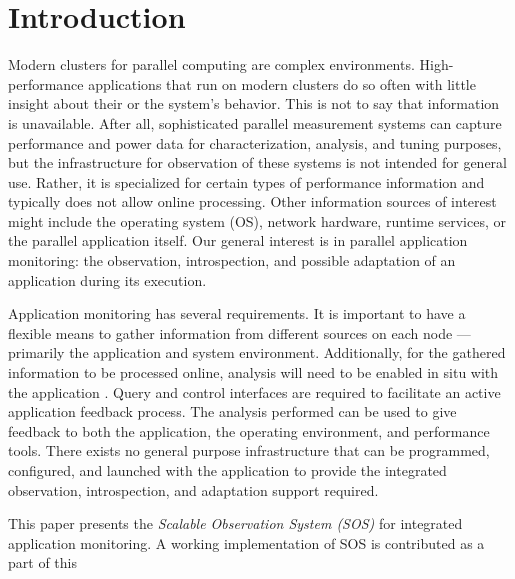 \section{Introduction}
%
Modern clusters for parallel computing are complex environments.
%
High-performance applications that run on modern clusters do so often with
little insight about their or the system's behavior.
%
This is not to say that information is unavailable. 
%
After all, sophisticated parallel measurement systems can capture performance and
power data for characterization, analysis, and tuning purposes, but
the infrastructure for observation of these systems is not intended
for general use.
%
Rather, it is specialized for certain types of performance information
and typically does not allow online processing.
%
Other information sources of interest might include the
operating system (OS), network hardware, runtime services, or the
parallel application itself.
%
Our general interest is in parallel application monitoring: the
observation, introspection, and possible adaptation of an application
during its execution.
%
\par
%
Application monitoring has several requirements.
%
%
It is important to have a flexible means to gather information from
different sources on each node --- primarily the application and
system environment.
%
%
Additionally, for the gathered information to be processed online,
analysis will need to be enabled in situ with the application
\cite{da2014architecture}.
%
%
Query and control interfaces are required to facilitate
an active application feedback process.
%
The analysis performed can be used to give feedback to both the
application, the operating environment, and performance tools.
%
There exists no general purpose infrastructure that can be programmed,
configured, and launched with the application to provide the
integrated observation, introspection, and adaptation support
required.
%
\par
%
This paper presents the \textit{Scalable Observation System (SOS)} for
integrated application monitoring.
%
A working implementation of SOS is contributed as a part of this
